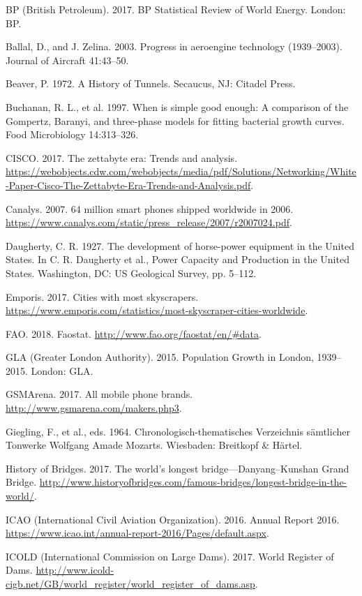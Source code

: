 \documentclass[aps,rmp,preprint,superscriptaddress,10pt,onecolumn]{article}
\begin{document}
BP (British Petroleum). 2017. BP Statistical Review of World Energy. London: BP.\par
Ballal, D., and J. Zelina. 2003. Progress in aeroengine technology (1939–2003). Journal of Aircraft 41:43–50.\par
Beaver, P. 1972. A History of Tunnels. Secaucus, NJ: Citadel Press.\par
Buchanan, R. L., et al. 1997. When is simple good enough: A comparison of the Gompertz, Baranyi, and three-phase models for fitting bacterial growth curves. Food Microbiology 14:313–326.\par
CISCO. 2017. The zettabyte era: Trends and analysis. \url{https://webobjects.cdw.com/webobjects/media/pdf/Solutions/Networking/White-Paper-Cisco-The-Zettabyte-Era-Trends-and-Analysis.pdf}.\par
Canalys. 2007. 64 million smart phones shipped worldwide in 2006. \url{https://www.canalys.com/static/press_release/2007/r2007024.pdf}.\par
Daugherty, C. R. 1927. The development of horse-power equipment in the United States. In C. R. Daugherty et al., Power Capacity and Production in the United States. Washington, DC: US Geological Survey, pp. 5–112.\par
Emporis. 2017. Cities with most skyscrapers. \url{https://www.emporis.com/statistics/most-skyscraper-cities-worldwide}.\par
FAO. 2018. Faostat. \url{http://www.fao.org/faostat/en/#data}.\par
GLA (Greater London Authority). 2015. Population Growth in London, 1939–2015. London: GLA.\par
GSMArena. 2017. All mobile phone brands. \url{http://www.gsmarena.com/makers.php3}.\par
Giegling, F., et al., eds. 1964. Chronologisch-thematisches Verzeichnis sämtlicher Tonwerke Wolfgang Amade Mozarts. Wiesbaden: Breitkopf \& Härtel.\par
History of Bridges. 2017. The world’s longest bridge—Danyang–Kunshan Grand Bridge. \url{http://www.historyofbridges.com/famous-bridges/longest-bridge-in-the-world/}.\par
ICAO (International Civil Aviation Organization). 2016. Annual Report 2016. \url{https://www.icao.int/annual-report-2016/Pages/default.aspx}.\par
ICOLD (International Commission on Large Dams). 2017. World Register of Dams. \url{http://www.icold-cigb.net/GB/world_register/world_register_of_dams.asp}.\par
\end{document}
